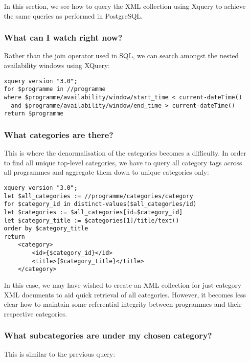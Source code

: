 \documentclass[11pt,a4paper]{article}
\begin{document}
In this section, we see how to query the XML collection using Xquery to
achieve the same queries as performed in PostgreSQL.

\subsubsection{What can I watch right now?}

Rather than the join operator used in SQL, we can search amongst
the nested availability windows using XQuery:

\begin{lstlisting}
xquery version "3.0";
for $programme in //programme
where $programme/availability/window/start_time < current-dateTime()
  and $programme/availability/window/end_time > current-dateTime()
return $programme
\end{lstlisting}

\subsubsection{What categories are there?}

This is where the denormalisation of the categories becomes a difficulty.
In order to find all unique top-level categories, we have to query all
category tags across all programmes and aggregate them down to unique
categories only:

\begin{lstlisting}
xquery version "3.0";
let $all_categories := //programme/categories/category
for $category_id in distinct-values($all_categories/id)
let $categories := $all_categories[id=$category_id]
let $category_title := $categories[1]/title/text()
order by $category_title
return 
    <category>
        <id>{$category_id}</id>
        <title>{$category_title}</title>
    </category>
\end{lstlisting}

In this case, we may have wished to create an XML collection for just
category XML documents to aid quick retrieval of all categories. However,
it becomes less clear how to maintain some referential integrity
between programmes and their respective categories.

\subsubsection{What subcategories are under my chosen category?}

This is similar to the previous query:
\end{document}
